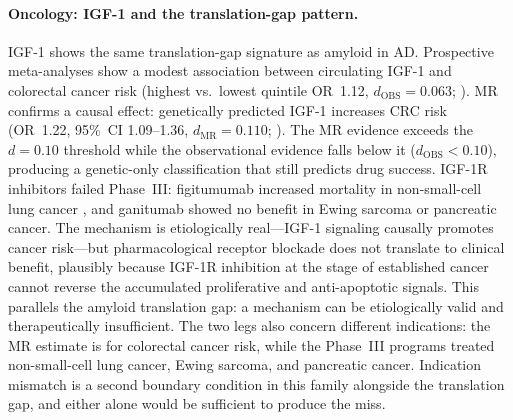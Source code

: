 \documentclass[11pt]{article}
\begin{document}
\paragraph{Oncology: IGF-1 and the translation-gap pattern.}
IGF-1 shows the same translation-gap signature as amyloid in AD. Prospective meta-analyses show a modest association between circulating IGF-1 and colorectal cancer risk (highest vs.\ lowest quintile OR~1.12, $d_{\text{OBS}} = 0.063$; \cite{rinaldi2019igfobs}). MR confirms a causal effect: genetically predicted IGF-1 increases CRC risk (OR~1.22, 95\%~CI 1.09--1.36, $d_{\text{MR}} = 0.110$; \cite{larsson2020igfcancer}). The MR evidence exceeds the $d = 0.10$ threshold while the observational evidence falls below it ($d_{\text{OBS}} < 0.10$), producing a genetic-only classification that still predicts drug success. IGF-1R inhibitors failed Phase~III: figitumumab increased mortality in non-small-cell lung cancer \cite{langer2014figitumumab}, and ganitumab showed no benefit in Ewing sarcoma \cite{juergens2023ganitumab} or pancreatic cancer. The mechanism is etiologically real---IGF-1 signaling causally promotes cancer risk---but pharmacological receptor blockade does not translate to clinical benefit, plausibly because IGF-1R inhibition at the stage of established cancer cannot reverse the accumulated proliferative and anti-apoptotic signals. This parallels the amyloid translation gap: a mechanism can be etiologically valid and therapeutically insufficient. The two legs also concern different indications: the MR estimate is for colorectal cancer risk, while the Phase~III programs treated non-small-cell lung cancer, Ewing sarcoma, and pancreatic cancer. Indication mismatch is a second boundary condition in this family alongside the translation gap, and either alone would be sufficient to produce the miss.
\end{document}
